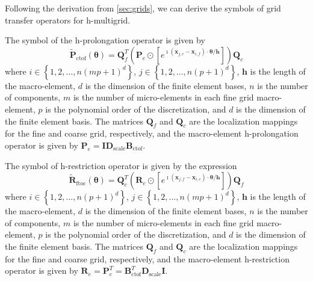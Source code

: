 \documentclass[review]{siamart190516}
\begin{document}
Following the derivation from \cref{sec:grids}, we can derive the symbols of grid transfer operators for h-multigrid.

\begin{definition}
The symbol of the h-prolongation operator is given by
\begin{equation}
\tilde{\mathbf{P}}_{\text{ctof}} \left( \boldsymbol{\theta} \right) = \mathbf{Q}_f^T \left( \mathbf{P}_e \odot \left[ e^{\imath \left( \mathbf{x}_{j, c} - \mathbf{x}_{i, f} \right) \cdot \mathbf{\theta} / \mathbf{h}} \right] \right) \mathbf{Q}_c
\end{equation}
where $i \in \left\lbrace 1, 2, \dots, n \left( m p + 1 \right)^d \right\rbrace$, $j \in \left\lbrace 1, 2, \dots, n \left( p + 1 \right)^d \right\rbrace$, $\mathbf{h}$ is the length of the macro-element, $d$ is the dimension of the finite element bases, $n$ is the number of components, $m$ is the number of micro-elements in each fine grid macro-element, $p$ is the polynomial order of the discretization, and $d$ is the dimension of the finite element basis.
The matrices $\mathbf{Q}_f$ and $\mathbf{Q}_c$ are the localization mappings for the fine and coarse grid, respectively, and the macro-element h-prolongation operator is given by $\mathbf{P}_e = \mathbf{I} \mathbf{D}_{\text{scale}} \mathbf{B}_{\text{ctof}}$.
\label{def:h_prolongation_symbol}
\end{definition}

\begin{definition}
The symbol of h-restriction operator is given by the expression
\begin{equation}
\tilde{\mathbf{R}}_{\text{ftoc}} \left( \boldsymbol{\theta} \right) = \mathbf{Q}_c^T \left( \mathbf{R}_e \odot \left[ e^{\imath \left( \mathbf{x}_{j, f} - \mathbf{x}_{i, c} \right) \cdot \boldsymbol{\theta} / \mathbf{h}} \right] \right) \mathbf{Q}_f
\end{equation}
where $i \in \left\lbrace 1, 2, \dots, n \left( p + 1 \right)^d \right\rbrace$, $j \in \left\lbrace 1, 2, \dots, n \left( m p + 1 \right)^d \right\rbrace$, $\mathbf{h}$ is the length of the macro-element, $d$ is the dimension of the finite element bases, $n$ is the number of components, $m$ is the number of micro-elements in each fine grid macro-element, $p$ is the polynomial order of the discretization, and $d$ is the dimension of the finite element basis.
The matrices $\mathbf{Q}_f$ and $\mathbf{Q}_c$ are the localization mappings for the fine and coarse grid, respectively, and the macro-element h-restriction operator is given by $\mathbf{R}_e = \mathbf{P}_e^T = \mathbf{B}_{\text{ctof}}^T \mathbf{D}_{\text{scale}} \mathbf{I}$.
\label{def:h_restriction_symbol}
\end{definition}
\end{document}
